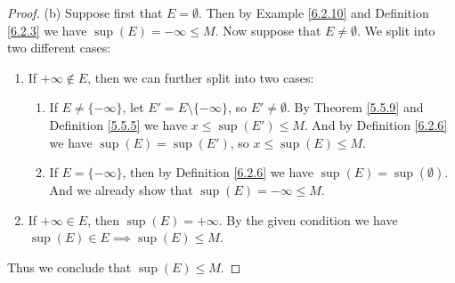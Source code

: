 \begin{proof}{(b)}
      Suppose first that \(E = \emptyset\).
      Then by Example \ref{6.2.10} and Definition \ref{6.2.3} we have \(\sup(E) = -\infty \leq M\).
      Now suppose that \(E \neq \emptyset\).
      We split into two different cases:
      \begin{enumerate}[label=(\Roman*)]
            \item If \(+\infty \not\in E\), then we can further split into two cases:
                  \begin{enumerate}[label=(\roman*)]
                        \item If \(E \neq \{-\infty\}\), let \(E' = E \setminus \{-\infty\}\), so \(E' \neq \emptyset\).
                              By Theorem \ref{5.5.9} and Definition \ref{5.5.5} we have \(x \leq \sup(E') \leq M\).
                              And by Definition \ref{6.2.6} we have \(\sup(E) = \sup(E')\), so \(x \leq \sup(E) \leq M\).
                        \item If \(E = \{-\infty\}\), then by Definition \ref{6.2.6} we have \(\sup(E) = \sup(\emptyset)\).
                              And we already show that \(\sup(E) = -\infty \leq M\).
                  \end{enumerate}
            \item If \(+\infty \in E\), then \(\sup(E) = +\infty\).
                  By the given condition we have \(\sup(E) \in E \implies \sup(E) \leq M\).
      \end{enumerate}
      Thus we conclude that \(\sup(E) \leq M\).
\end{proof}

